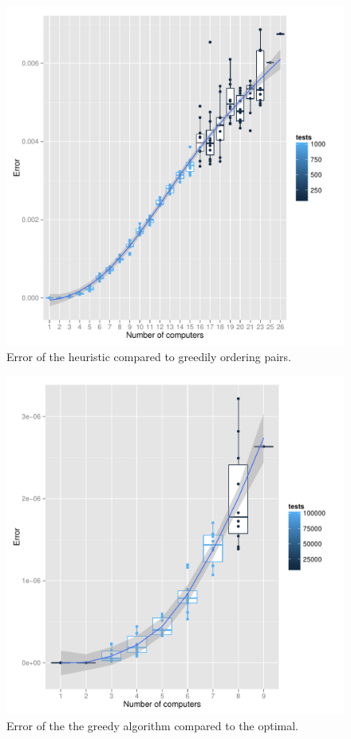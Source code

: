 \documentclass[11pt]{llncs}
\begin{document}
		\begin{figure}
		\includegraphics{boxpexheur.pdf} %
		\caption{Error of the heuristic compared to greedily ordering pairs.}
		\end{figure}
		
		\begin{figure}
		\includegraphics{bpxpexex.pdf} %
		\caption{Error of the the greedy algorithm compared to the optimal.}
		\end{figure}
\end{document}
